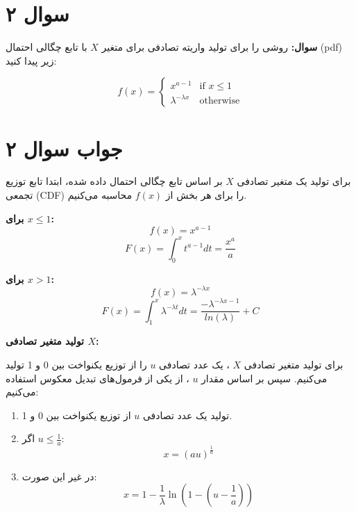\section*{سوال ۲}

\textbf{سوال:} روشی را برای تولید واریته تصادفی برای متغیر \( X \) با تابع چگالی احتمال (pdf) زیر پیدا کنید:

\[
f(x) = 
\begin{cases} 
	x^{a-1} & \text{if } x \leq 1 \\
	\lambda^{-\lambda x} & \text{otherwise}
\end{cases}
\]

\section*{جواب سوال ۲}

برای تولید یک متغیر تصادفی \( X \) بر اساس تابع چگالی احتمال داده شده، ابتدا تابع توزیع تجمعی (CDF) را برای هر بخش از \( f(x) \) محاسبه می‌کنیم.

\textbf{برای \( x \leq 1 \):}
\[ f(x) = x^{a-1} \]
\[ F(x) = \int_{0}^{x} t^{a-1} dt = \frac{x^a}{a} \]

\textbf{برای \( x > 1 \):}
\[ f(x) = \lambda^{-\lambda x} \]
\[ F(x) = \int_{1}^{x} \lambda^{-\lambda t} dt = \frac{-\lambda^{-\lambda x-1}}{ln(\lambda)} + C \]

\textbf{تولید متغیر تصادفی \( X \):}


برای تولید متغیر تصادفی
$X$
، یک عدد تصادفی
$u$
را از توزیع یکنواخت بین 0 و 1 تولید می‌کنیم. سپس بر اساس مقدار 
$u$
، از یکی از فرمول‌های تبدیل معکوس استفاده می‌کنیم:

\begin{enumerate}
	\item تولید یک عدد تصادفی \( u \) از توزیع یکنواخت بین 0 و 1.
	\item اگر \( u \leq \frac{1}{a} \):
	\[ x = (au)^{\frac{1}{a}} \]
	\item در غیر این صورت:
	\[ x = 1 - \frac{1}{\lambda} \ln(1 - (u - \frac{1}{a})) \]
\end{enumerate}
